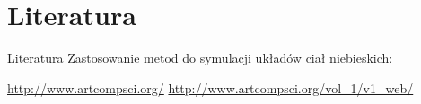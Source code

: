 \section{Literatura}
\begin{frame}{Literatura}
Zastosowanie metod do symulacji układów ciał niebieskich:

\url{http://www.artcompsci.org/}
\url{http://www.artcompsci.org/vol_1/v1_web/}
	
\end{frame}